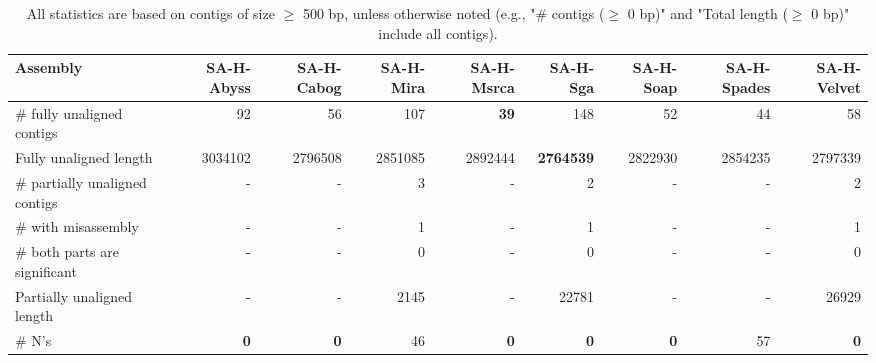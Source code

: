 \documentclass[12pt,a4paper]{article}
\begin{document}
\begin{table}[ht]
\begin{center}
\caption{All statistics are based on contigs of size $\geq$ 500 bp, unless otherwise noted (e.g., "\# contigs ($\geq$ 0 bp)" and "Total length ($\geq$ 0 bp)" include all contigs).}
\begin{tabular}{|l*{8}{|r}|}
\hline
Assembly & SA-H-Abyss & SA-H-Cabog & SA-H-Mira & SA-H-Msrca & SA-H-Sga & SA-H-Soap & SA-H-Spades & SA-H-Velvet \\ \hline
\# fully unaligned contigs & 92 & 56 & 107 & {\bf 39} & 148 & 52 & 44 & 58 \\ \hline
Fully unaligned length & 3034102 & 2796508 & 2851085 & 2892444 & {\bf 2764539} & 2822930 & 2854235 & 2797339 \\ \hline
\# partially unaligned contigs & - & - & 3 & - & 2 & - & - & 2 \\ \hline
\hspace{5mm}\# with misassembly & - & - & 1 & - & 1 & - & - & 1 \\ \hline
\hspace{5mm}\# both parts are significant & - & - & 0 & - & 0 & - & - & 0 \\ \hline
Partially unaligned length & - & - & 2145 & - & 22781 & - & - & 26929 \\ \hline
\# N's & {\bf 0} & {\bf 0} & 46 & {\bf 0} & {\bf 0} & {\bf 0} & 57 & {\bf 0} \\ \hline
\end{tabular}
\end{center}
\end{table}
\end{document}
